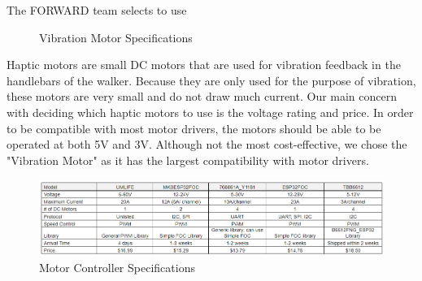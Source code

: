 \noindent The FORWARD team selects to use \\

\begin{figure}[H]
	\centering
	\setlength{\tabcolsep}{5pt} %
	\renewcommand{\arraystretch}{1.75} %
	\caption{\label{fig:vibrationMotorSpecifications}Vibration Motor Specifications}
\end{figure}

\noindent Haptic motors are small DC motors that are used for vibration feedback in the handlebars of the walker. Because they are only used for the purpose of vibration, these motors are very small and do not draw much current. Our main concern with deciding which haptic motors to use is the voltage rating and price. In order to be compatible with most motor drivers, the motors should be able to be operated at both 5V and 3V. Although not the most cost-effective, we chose the "Vibration Motor" as it has the largest compatibility with motor drivers.\\

\begin{figure}[H]
	\centering
	\includegraphics[width=1\textwidth]{./Images/motor_controller_table.png}
	\caption{\label{fig:motor_controller}Motor Controller Specifications}
\end{figure}

